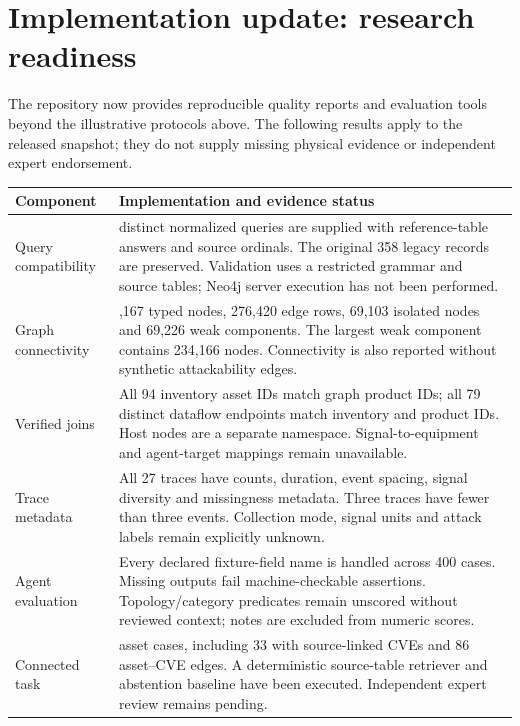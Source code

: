 \clearpage\section*{Implementation update: research readiness}
The repository now provides reproducible quality reports and evaluation tools beyond the illustrative protocols above. The following results apply to the released snapshot; they do not supply missing physical evidence or independent expert endorsement.

\begingroup\small\renewcommand{\arraystretch}{1.3}
\begin{tabularx}{\linewidth}{>{\raggedright\arraybackslash}p{35mm}>{\raggedright\arraybackslash}X}
\toprule\textbf{Component} & \textbf{Implementation and evidence status}\\\midrule
Query compatibility & 66 distinct normalized queries are supplied with reference-table answers and source ordinals. The original 358 legacy records are preserved. Validation uses a restricted grammar and source tables; Neo4j server execution has not been performed.\\
Graph connectivity & 305,167 typed nodes, 276,420 edge rows, 69,103 isolated nodes and 69,226 weak components. The largest weak component contains 234,166 nodes. Connectivity is also reported without synthetic attackability edges.\\
Verified joins & All 94 inventory asset IDs match graph product IDs; all 79 distinct dataflow endpoints match inventory and product IDs. Host nodes are a separate namespace. Signal-to-equipment and agent-target mappings remain unavailable.\\
Trace metadata & All 27 traces have counts, duration, event spacing, signal diversity and missingness metadata. Three traces have fewer than three events. Collection mode, signal units and attack labels remain explicitly unknown.\\
Agent evaluation & Every declared fixture-field name is handled across 400 cases. Missing outputs fail machine-checkable assertions. Topology/category predicates remain unscored without reviewed context; notes are excluded from numeric scores.\\
Connected task & 94 asset cases, including 33 with source-linked CVEs and 86 asset--CVE edges. A deterministic source-table retriever and abstention baseline have been executed. Independent expert review remains pending.\\
\bottomrule\end{tabularx}\endgroup

